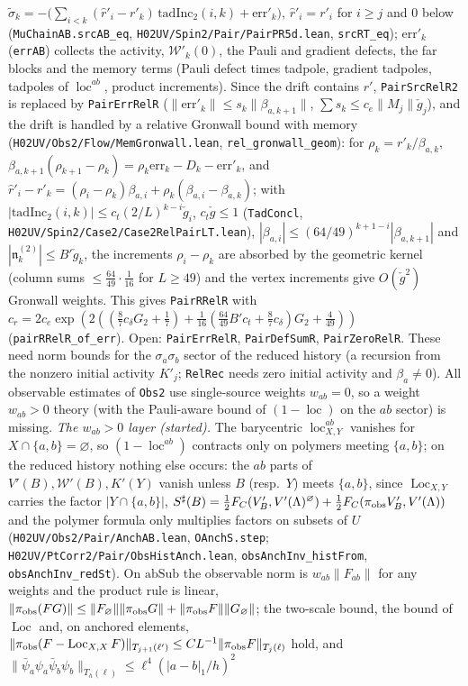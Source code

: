 \documentclass[11pt]{amsart}
\theoremstyle{definition}
\theoremstyle{remark}
\numberwithin{equation}{section}
\begin{document}
$\tilde\sigma_k=-\big(\sum_{i<k}(\hat r'_i-r'_k)\,\mathrm{tadInc}_2(i,k)+\mathrm{err}'_k\big)$, $\hat r'_i=r'_i$ for $i\ge j$ and $0$ below (\texttt{MuChainAB.srcAB\_eq}, \texttt{H02UV/Spin2/Pair/PairPR5d.lean}, \texttt{srcRT\_eq}); $\mathrm{err}'_k$ (\texttt{errAB}) collects the activity, $\mathcal W'_k(0)$, the Pauli and gradient defects, the far blocks and the memory terms (Pauli defect times tadpole, gradient tadpoles, tadpoles of $\operatorname{loc}^{ab}$, product increments). Since the drift contains $r'$, \texttt{PairSrcRelR2} is replaced by \texttt{PairErrRelR} ($\|\mathrm{err}'_k\|\le s_k\|\beta_{a,k+1}\|$, $\sum s_k\le c_e\|M_j\|\check g_j$), and the drift is handled by a relative Gronwall bound with memory (\texttt{H02UV/Obs2/Flow/MemGronwall.lean}, \texttt{rel\_gronwall\_geom}): for $\rho_k=r'_k/\beta_{a,k}$, $\beta_{a,k+1}(\rho_{k+1}-\rho_k)=\rho_k\mathrm{err}_k-D_k-\mathrm{err}'_k$, and $\hat r'_i-r'_k=(\rho_i-\rho_k)\beta_{a,i}+\rho_k(\beta_{a,i}-\beta_{a,k})$; with $|\mathrm{tadInc}_2(i,k)|\le c_t(2/L)^{k-i}\check g_i$, $c_t\check g\le1$ (\texttt{TadConcl}, \texttt{H02UV/Spin2/Case2/Case2RelPairLT.lean}), $|\beta_{a,i}|\le(64/49)^{k+1-i}|\beta_{a,k+1}|$ and $|\mathfrak n^{(2)}_k|\le B'\check g_k$, the increments $\rho_i-\rho_k$ are absorbed by the geometric kernel (column sums $\le\frac{64}{49}\cdot\frac1{16}$ for $L\ge49$) and the vertex increments give $O(\check g^2)$ Gronwall weights. This gives \texttt{PairRRelR} with $c_r=2c_e\exp(2((\frac87c_\delta G_2+\frac17)+\frac1{16}(\frac{64}{49}B'c_t+\frac87c_\delta)G_2+\frac{4}{49}))$ (\texttt{pairRRelR\_of\_err}). Open: \texttt{PairErrRelR}, \texttt{PairDefSumR}, \texttt{PairZeroRelR}. These need norm bounds for the $\sigma_a\sigma_b$ sector of the reduced history (a recursion from the nonzero initial activity $K'_{j}$; \texttt{RelRec} needs zero initial activity and $\beta_a\neq0$). All observable estimates of \texttt{Obs2} use single-source weights $w_{ab}=0$, so a weight $w_{ab}>0$ theory (with the Pauli-aware bound of $(1-\operatorname{loc})$ on the $ab$ sector) is missing. \emph{The $w_{ab}>0$ layer (started).} The barycentric $\operatorname{loc}^{ab}_{X,Y}$ vanishes for $X\cap\{a,b\}=\varnothing$, so $(1-\operatorname{loc}^{ab})$ contracts only on polymers meeting $\{a,b\}$; on the reduced history nothing else occurs: the $ab$ parts of $V'(B),\mathcal W'(B),K'(Y)$ vanish unless $B$ (resp.\ $Y$) meets $\{a,b\}$, since $\operatorname{Loc}_{X,Y}$ carries the factor $|Y\cap\{a,b\}|$, $S^\sharp(B)=\frac12F_C(V'_B,V'(\Lambda)^\varnothing)+\frac12F_C(\pi_{\rm obs}V'_B,V'(\Lambda))$ and the polymer formula only multiplies factors on subsets of $U$ (\texttt{H02UV/Obs2/Pair/AnchAB.lean}, \texttt{OAnchS.step}; \texttt{H02UV/PtCorr2/Pair/ObsHistAnch.lean}, \texttt{obsAnchInv\_histFrom}, \texttt{obsAnchInv\_redSt}). On $\mathrm{abSub}$ the observable norm is $w_{ab}\|F_{ab}\|$ for any weights and the product rule is linear, $\|\pi_{\rm obs}(FG)\|\le\|F_\varnothing\|\|\pi_{\rm obs}G\|+\|\pi_{\rm obs}F\|\|G_\varnothing\|$; the two-scale bound, the bound of $\operatorname{Loc}$ and, on anchored elements, $\|\pi_{\rm obs}(F-\operatorname{Loc}_{X,X}F)\|_{T_{j+1}(\ell')}\le CL^{-1}\|\pi_{\rm obs}F\|_{T_j(\ell)}$ hold, and $\|\bar\psi_a\psi_a\bar\psi_b\psi_b\|_{T_h(\ell)}\le\ell^4(|a-b|_1/h)^2$ 
\end{document}
